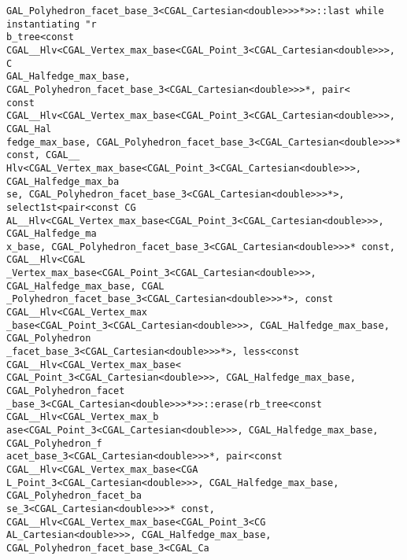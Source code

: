 \begin{titlepage}
\begin{lcTexBlock}
{\verb+GAL_Polyhedron_facet_base_3<CGAL_Cartesian<double>>>*>>::last while instantiating "r+\\
\verb+b_tree<const CGAL__Hlv<CGAL_Vertex_max_base<CGAL_Point_3<CGAL_Cartesian<double>>>, C+\\
\verb+GAL_Halfedge_max_base, CGAL_Polyhedron_facet_base_3<CGAL_Cartesian<double>>>*, pair<+\\
\verb+const CGAL__Hlv<CGAL_Vertex_max_base<CGAL_Point_3<CGAL_Cartesian<double>>>, CGAL_Hal+\\
\verb+fedge_max_base, CGAL_Polyhedron_facet_base_3<CGAL_Cartesian<double>>>* const, CGAL__+\\
\verb+Hlv<CGAL_Vertex_max_base<CGAL_Point_3<CGAL_Cartesian<double>>>, CGAL_Halfedge_max_ba+\\
\verb+se, CGAL_Polyhedron_facet_base_3<CGAL_Cartesian<double>>>*>, select1st<pair<const CG+\\
\verb+AL__Hlv<CGAL_Vertex_max_base<CGAL_Point_3<CGAL_Cartesian<double>>>, CGAL_Halfedge_ma+\\
\verb+x_base, CGAL_Polyhedron_facet_base_3<CGAL_Cartesian<double>>>* const, CGAL__Hlv<CGAL+\\
\verb+_Vertex_max_base<CGAL_Point_3<CGAL_Cartesian<double>>>, CGAL_Halfedge_max_base, CGAL+\\
\verb+_Polyhedron_facet_base_3<CGAL_Cartesian<double>>>*>, const CGAL__Hlv<CGAL_Vertex_max+\\
\verb+_base<CGAL_Point_3<CGAL_Cartesian<double>>>, CGAL_Halfedge_max_base, CGAL_Polyhedron+\\
\verb+_facet_base_3<CGAL_Cartesian<double>>>*>, less<const CGAL__Hlv<CGAL_Vertex_max_base<+\\
\verb+CGAL_Point_3<CGAL_Cartesian<double>>>, CGAL_Halfedge_max_base, CGAL_Polyhedron_facet+\\
\verb+_base_3<CGAL_Cartesian<double>>>*>>::erase(rb_tree<const CGAL__Hlv<CGAL_Vertex_max_b+\\
\verb+ase<CGAL_Point_3<CGAL_Cartesian<double>>>, CGAL_Halfedge_max_base, CGAL_Polyhedron_f+\\
\verb+acet_base_3<CGAL_Cartesian<double>>>*, pair<const CGAL__Hlv<CGAL_Vertex_max_base<CGA+\\
\verb+L_Point_3<CGAL_Cartesian<double>>>, CGAL_Halfedge_max_base, CGAL_Polyhedron_facet_ba+\\
\verb+se_3<CGAL_Cartesian<double>>>* const, CGAL__Hlv<CGAL_Vertex_max_base<CGAL_Point_3<CG+\\
\verb+AL_Cartesian<double>>>, CGAL_Halfedge_max_base, CGAL_Polyhedron_facet_base_3<CGAL_Ca+\\
}
\end{lcTexBlock}
\end{titlepage}
